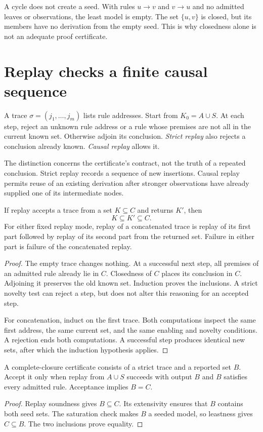 A cycle does not create a seed. With rules $u\to v$ and $v\to u$ and no admitted leaves or observations, the least model is empty. The set $\{u,v\}$ is closed, but its members have no derivation from the empty seed. This is why closedness alone is not an adequate proof certificate.

\section{Replay checks a finite causal sequence}
A trace $\sigma=(j_1,\ldots,j_m)$ lists rule addresses. Start from $K_0=A\cup S$. At each step, reject an unknown rule address or a rule whose premises are not all in the current known set. Otherwise adjoin its conclusion. \emph{Strict replay} also rejects a conclusion already known. \emph{Causal replay} allows it.

The distinction concerns the certificate's contract, not the truth of a repeated conclusion. Strict replay records a sequence of new insertions. Causal replay permits reuse of an existing derivation after stronger observations have already supplied one of its intermediate nodes.

\begin{theorem}\label{r:field-replay}
If replay accepts a trace from a set $K\subseteq C$ and returns $K'$, then
\[
 K\subseteq K'\subseteq C.
\]
For either fixed replay mode, replay of a concatenated trace is replay of its first part followed by replay of its second part from the returned set. Failure in either part is failure of the concatenated replay.
\end{theorem}
\begin{proof}
The empty trace changes nothing. At a successful next step, all premises of an admitted rule already lie in $C$. Closedness of $C$ places its conclusion in $C$. Adjoining it preserves the old known set. Induction proves the inclusions. A strict novelty test can reject a step, but does not alter this reasoning for an accepted step.

For concatenation, induct on the first trace. Both computations inspect the same first address, the same current set, and the same enabling and novelty conditions. A rejection ends both computations. A successful step produces identical new sets, after which the induction hypothesis applies.
\end{proof}

\begin{theorem}\label{r:field-exact}
A complete-closure certificate consists of a strict trace and a reported set $B$. Accept it only when replay from $A\cup S$ succeeds with output $B$ and $B$ satisfies every admitted rule. Acceptance implies $B=C$.
\end{theorem}
\begin{proof}
Replay soundness gives $B\subseteq C$. Its extensivity ensures that $B$ contains both seed sets. The saturation check makes $B$ a seeded model, so leastness gives $C\subseteq B$. The two inclusions prove equality.
\end{proof}

